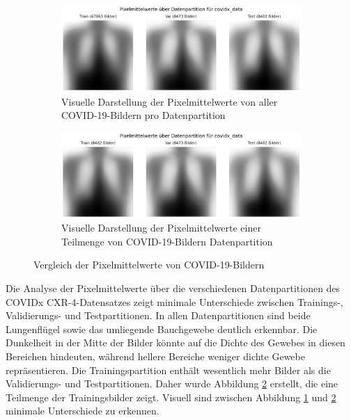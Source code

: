 \begin{figure}[H]
    \centering
    \begin{subfigure}[b]{0.49\linewidth}
        \centering
        \includegraphics[width=\linewidth]{01-images/03-data/covid-pixelmittelwerte.png}
        \caption{Visuelle Darstellung der Pixelmittelwerte von aller COVID-19-Bildern pro Datenpartition}
        \label{fig:covid-pixelmittelwert-full}
    \end{subfigure}
    \hfill
    \begin{subfigure}[b]{0.49\linewidth}
        \centering
        \includegraphics[width=\linewidth]{01-images/03-data/covidx-pixelmittelwert-subsample-train.png}
        \caption{Visuelle Darstellung der Pixelmittelwerte einer Teilmenge von COVID-19-Bildern Datenpartition}
        \label{fig:covid-pixelmittelwert-subsample}
    \end{subfigure}
    \caption{Vergleich der Pixelmittelwerte von COVID-19-Bildern}
    \label{fig:covid-pixelmittelwert-comparison}
\end{figure}

Die Analyse der Pixelmittelwerte über die verschiedenen Datenpartitionen des COVIDx CXR-4-Datensatzes zeigt minimale Unterschiede zwischen Trainings-, Validierungs- und Testpartitionen. In allen Datenpartitionen sind beide Lungenflügel sowie das umliegende Bauchgewebe deutlich erkennbar. Die Dunkelheit in der Mitte der Bilder könnte auf die Dichte des Gewebes in diesen Bereichen hindeuten, während hellere Bereiche weniger dichte Gewebe repräsentieren. Die Trainingspartition enthält wesentlich mehr Bilder als die Validierungs- und Testpartitionen. Daher wurde Abbildung \ref{fig:covid-pixelmittelwert-subsample} erstellt, die eine Teilmenge der Trainingsbilder zeigt. Visuell sind zwischen Abbildung \ref{fig:covid-pixelmittelwert-full} und \ref{fig:covid-pixelmittelwert-subsample} minimale Unterschiede zu erkennen.

